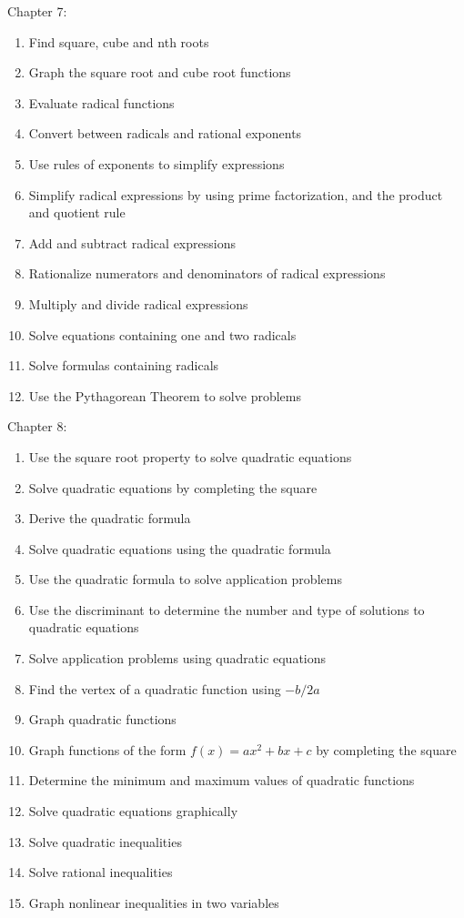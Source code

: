 \documentclass[11pt]{article}
\newenvironment{alphalist}{
  \begin{enumerate}[(1)]
    \addtolength{\itemsep}{-1.0\itemsep}}
  {\end{enumerate}}
\begin{document}
\noindent Chapter 7:
\begin{alphalist}
    \item Find square, cube and nth roots
    \item Graph the square root and cube root functions
    \item Evaluate radical functions
    \item Convert between radicals and rational exponents
    \item Use rules of exponents to simplify expressions
    \item Simplify radical expressions by using prime factorization, and the product and quotient rule
    \item Add and subtract radical expressions
    \item Rationalize numerators and denominators of radical expressions
    \item Multiply and divide radical expressions
    \item Solve equations containing one and two radicals
    \item Solve formulas containing radicals
    \item Use the Pythagorean Theorem to solve problems 
\end{alphalist}
\noindent Chapter 8:
\begin{alphalist}
    \item Use the square root property to solve quadratic equations
    \item Solve quadratic equations by completing the square
    \item Derive the quadratic formula
    \item Solve quadratic equations using the quadratic formula
    \item Use the quadratic formula to solve application problems
    \item Use the discriminant to determine the number and type of solutions to quadratic equations
    \item Solve application problems using quadratic equations
    \item Find the vertex of a quadratic function using $-b/2a$
    \item Graph quadratic functions
    \item Graph functions of the form $f(x) = ax^2 + bx + c$ by completing the square
    \item Determine the minimum and maximum values of quadratic functions
    \item Solve quadratic equations graphically
    \item Solve quadratic inequalities
    \item Solve rational inequalities
    \item Graph nonlinear inequalities in two variables
\end{alphalist}
\end{document}
